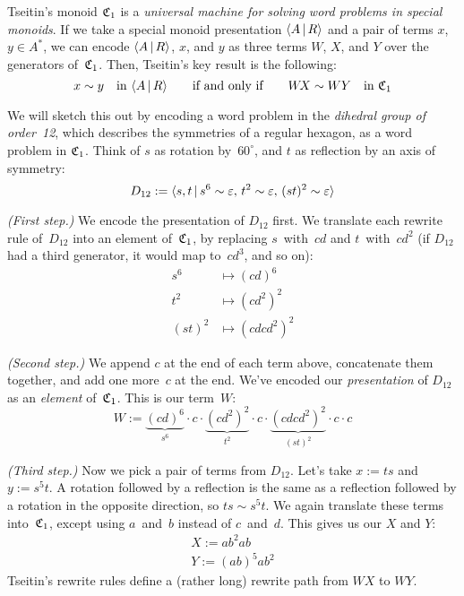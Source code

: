 \documentclass[../generics]{subfiles}
\begin{document}
Tseitin's monoid $\mathfrak{C}_1$ is a \textsl{universal machine for solving word problems in special monoids}. If we take a special monoid presentation $\langle A\,|\,R\rangle$ and a pair of terms $x$, $y\in A^*$, we can encode $\langle A\,|\,R\rangle$, $x$, and $y$ as three terms $W\!$, $X$, and $Y$ over the generators of~$\mathfrak{C}_1$. Then, Tseitin's key result is the following:
\[x\sim y\quad\text{in $\langle A\,|\,R\rangle$}\qquad \text{if and only if} \qquad W\! X\sim WY \quad \text{in $\mathfrak{C}_1$}\]

We will sketch this out by encoding a word problem in the \emph{dihedral group of order~12}, which describes the symmetries of a regular hexagon, as a word problem in $\mathfrak{C}_1$. Think of $s$ as rotation by~$60^\circ$, and $t$ as reflection by an axis of symmetry:
\[D_{12} := \langle s,t\,|\,s^6\sim\varepsilon,\, t^2\sim\varepsilon,\, (st)^2\sim \varepsilon\rangle\]

\smallskip

\emph{(First step.)} We encode the presentation of $D_{12}$ first. We translate each rewrite rule of~$D_{12}$ into an element of~$\mathfrak{C}_1$, by replacing $s$~with~$cd$ and $t$~with~$cd^2$ (if $D_{12}$ had a third generator, it would map to~$cd^3$, and so on):
\begin{align*}
s^6 &\mapsto (cd)^6\\
t^2 &\mapsto (cd^2)^2\\
(st)^2 &\mapsto (cdcd^2)^2
\end{align*}

\smallskip

\emph{(Second step.)} We append $c$ at the end of each term above, concatenate them together, and add one more~$c$ at the end. We've encoded our \emph{presentation} of $D_{12}$ as an \emph{element} of~$\mathfrak{C}_1$. This is our term~$W$:
\[
W := \underbrace{(cd)^6}_{s^6}{} \cdot c\cdot \underbrace{(cd^2)^2}_{t^2}{} \cdot c\cdot \underbrace{(cdcd^2)^2}_{(st)^2} {}\cdot c\cdot c
\]

\smallskip

\emph{(Third step.)} Now we pick a pair of terms from $D_{12}$. Let's take $x:=ts$ and $y:=s^5t$. A rotation followed by a reflection is the same as a reflection followed by a rotation in the opposite direction, so $ts\sim s^5t$. We again translate these terms into~$\mathfrak{C}_1$, except using $a$~and~$b$ instead of $c$~and~$d$. This gives us our $X$ and $Y$:
\begin{gather*}
X := ab^2ab\\
Y := (ab)^5ab^2
\end{gather*}
Tseitin's rewrite rules define a (rather long) rewrite path from $W\! X$ to $WY$.
\end{document}
